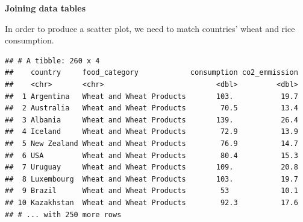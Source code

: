 \documentclass[ignorenonframetext,]{beamer}
\newenvironment{Shaded}{\begin{snugshade}}{\end{snugshade}}
\newcommand{\KeywordTok}[1]{\textcolor[rgb]{0.13,0.29,0.53}{\textbf{#1}}}
\newcommand{\NormalTok}[1]{#1}
\newcommand{\OperatorTok}[1]{\textcolor[rgb]{0.81,0.36,0.00}{\textbf{#1}}}
\newcommand{\StringTok}[1]{\textcolor[rgb]{0.31,0.60,0.02}{#1}}
\begin{document}
\begin{frame}[fragile]{}
\protect\hypertarget{section-18}{}

\textbf{\large Joining data tables}

In order to produce a scatter plot, we need to match countries' wheat
and rice consumption.

\vspace{1ex}\scriptsize

\begin{Shaded}
\end{Shaded}

\begin{verbatim}
## # A tibble: 260 x 4
##    country     food_category            consumption co2_emmission
##    <chr>       <chr>                          <dbl>         <dbl>
##  1 Argentina   Wheat and Wheat Products       103.           19.7
##  2 Australia   Wheat and Wheat Products        70.5          13.4
##  3 Albania     Wheat and Wheat Products       139.           26.4
##  4 Iceland     Wheat and Wheat Products        72.9          13.9
##  5 New Zealand Wheat and Wheat Products        76.9          14.7
##  6 USA         Wheat and Wheat Products        80.4          15.3
##  7 Uruguay     Wheat and Wheat Products       109.           20.8
##  8 Luxembourg  Wheat and Wheat Products       103.           19.7
##  9 Brazil      Wheat and Wheat Products        53            10.1
## 10 Kazakhstan  Wheat and Wheat Products        92.3          17.6
## # ... with 250 more rows
\end{verbatim}

\end{frame}
\end{document}
